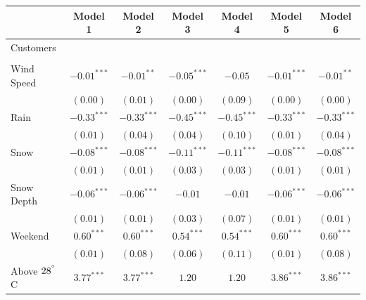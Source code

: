 \documentclass[12pt,letter paper]{article}
\begin{document}
\bgroup
\def\arraystretch{0.5}
\begin{table}[H]
\begin{center}
\begin{tabular}{l c c c c c c }
\hline
 & Model 1 & Model 2 & Model 3 & Model 4 & Model 5 & Model 6 \\
\hline
Customers                                  &               &               &               &               &               &               \\
                                           &               &               &               &               &               &               \\
\quad Wind Speed                                 & $-0.01^{***}$ & $-0.01^{**}$  & $-0.05^{***}$ & $-0.05$       & $-0.01^{***}$ & $-0.01^{**}$  \\
                                           & $(0.00)$      & $(0.01)$      & $(0.00)$      & $(0.09)$      & $(0.00)$      & $(0.00)$      \\
\quad Rain                                 & $-0.33^{***}$ & $-0.33^{***}$ & $-0.45^{***}$ & $-0.45^{***}$ & $-0.33^{***}$ & $-0.33^{***}$ \\
                                           & $(0.01)$      & $(0.04)$      & $(0.04)$      & $(0.10)$      & $(0.01)$      & $(0.04)$      \\
\quad Snow                                 & $-0.08^{***}$ & $-0.08^{***}$ & $-0.11^{***}$ & $-0.11^{***}$ & $-0.08^{***}$ & $-0.08^{***}$ \\
                                           & $(0.01)$      & $(0.01)$      & $(0.03)$      & $(0.03)$      & $(0.01)$      & $(0.01)$      \\
\quad Snow Depth                          & $-0.06^{***}$ & $-0.06^{***}$ & $-0.01$       & $-0.01$       & $-0.06^{***}$ & $-0.06^{***}$ \\
                                           & $(0.01)$      & $(0.01)$      & $(0.03)$      & $(0.07)$      & $(0.01)$      & $(0.01)$      \\
\quad Weekend                              & $0.60^{***}$  & $0.60^{***}$  & $0.54^{***}$  & $0.54^{***}$  & $0.60^{***}$  & $0.60^{***}$  \\
                                           & $(0.01)$      & $(0.08)$      & $(0.06)$      & $(0.11)$      & $(0.01)$      & $(0.08)$      \\
\quad Above $28^{\degree}$C                        & $3.77^{***}$  & $3.77^{***}$  & $1.20$        & $1.20$        & $3.86^{***}$  & $3.86^{***}$  \\

\end{tabular}
\end{center}
\end{table}
\end{document}
